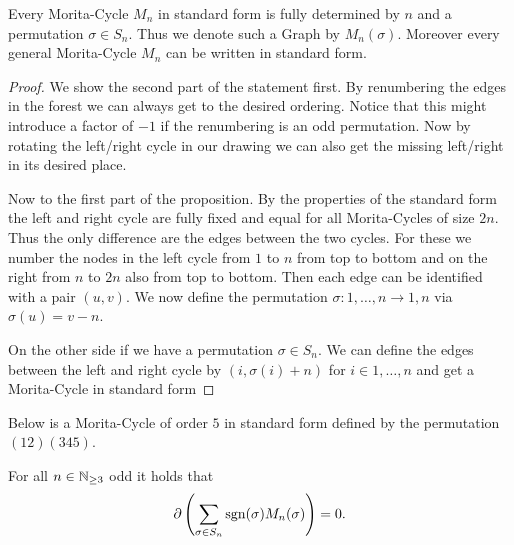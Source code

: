 \begin{proposition}
	Every Morita-Cycle $M_{n}$ in standard form is fully determined by $n$ and a permutation $\sigma \in S_{n}$. Thus we denote 
	such a Graph by $M_{n}(\sigma)$.
	Moreover every general Morita-Cycle $M_{n}$ can be written in standard form.
\end{proposition}

\begin{proof}
	We show the second part of the statement first.
	By renumbering the edges in the forest we can always get to the desired ordering. Notice that this might introduce a factor of $-1$
	if the renumbering is an odd permutation.
	Now by rotating the left/right cycle in our drawing we can also get the missing left/right in its desired place.

	Now to the first part of the proposition.
	By the properties of the standard form the left and right cycle are fully fixed and equal for all Morita-Cycles of size $2 n$.
	Thus the only difference are the edges between the two cycles.
	For these we number the nodes in the left cycle from $1$ to $n$ from top to bottom
	and on the right from $n$ to  $2 n$ also from top to bottom. Then each edge can be identified with a pair $(u,v)$.
	We now define the permutation $\sigma: {1,\ldots,n} \to {1,n}$ via $\sigma(u) = v - n$.

	On the other side if we have a permutation $\sigma \in S_{n}$. We can define the edges between the left and right cycle
	by $(i,\sigma(i) +n)$ for $i \in {1,\ldots,n}$ and get a Morita-Cycle in standard form
\end{proof}

\begin{eg}
	Below is a Morita-Cycle of order $5$ in standard form defined by the permutation $(12)(345)$.
\end{eg}

\begin{theorem}
	For all $n \in \mathbb{N}_{\geq 3}$ odd it holds that 
	\[
		\partial\left(\sum_{\sigma \in S_{n}} \operatorname{sgn}(\sigma) M_{n}(\sigma)\right) = 0
	.\] 
\end{theorem}

